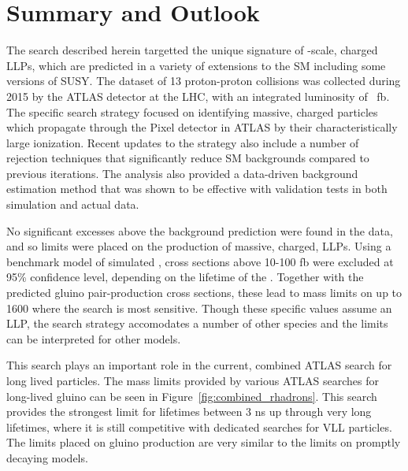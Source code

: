 \chapter{Summary and Outlook}

\label{ch:conclusion}

The search described herein targetted the unique signature of \TeV-scale, charged \acp{LLP}, which are predicted in a variety of extensions to the \ac{SM} including some versions of \ac{SUSY}.
The dataset of 13 \TeV proton-proton collisions was collected during 2015 by the ATLAS detector at the \ac{LHC}, with an integrated luminosity of \lumi~fb.
The specific search strategy focused on identifying massive, charged particles which propagate through the Pixel detector in ATLAS by their characteristically large ionization.
Recent updates to the strategy also include a number of rejection techniques that significantly reduce \ac{SM} backgrounds compared to previous iterations.
The analysis also provided a data-driven background estimation method that was shown to be effective with validation tests in both simulation and actual data.

No significant excesses above the background prediction were found in the data, and so limits were placed on the production of massive, charged, \acp{LLP}.
Using a benchmark model of simulated \rhadrons, cross sections above 10-100 fb were excluded at 95\% confidence level, depending on the lifetime of the \rhadron.
Together with the predicted gluino pair-production cross sections, these lead to mass limits on \rhadrons up to 1600 \GeV where the search is most sensitive.
Though these specific values assume an \rhadron \ac{LLP}, the search strategy accomodates a number of other species and the limits can be interpreted for other models.

This search plays an important role in the current, combined ATLAS search for long lived particles.
The mass limits provided by various ATLAS searches for long-lived gluino \rhadrons can be seen in Figure~\ref{fig:combined_rhadrons}.
This search provides the strongest limit for lifetimes between 3 ns up through very long lifetimes, where it is still competitive with dedicated searches for \ac{VLL} particles.
The limits placed on gluino production are very similar to the limits on promptly decaying models.

